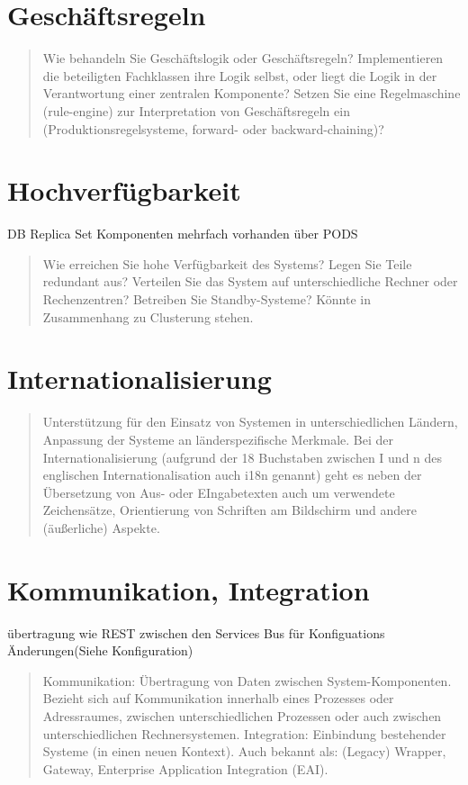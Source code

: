 \section{Geschäftsregeln}

\begin{quote}
	Wie behandeln Sie Geschäftslogik oder Geschäftsregeln? Implementieren die beteiligten Fachklassen ihre Logik selbst, oder liegt die Logik in der Verantwortung einer zentralen Komponente? Setzen Sie eine Regelmaschine (rule-engine) zur Interpretation von Geschäftsregeln ein (Produktionsregelsysteme, forward- oder backward-chaining)?
\end{quote}

\section{Hochverfügbarkeit}

DB Replica Set
Komponenten mehrfach vorhanden über PODS

\begin{quote}
	Wie erreichen Sie hohe Verfügbarkeit des Systems? Legen Sie Teile redundant aus? Verteilen Sie das System auf unterschiedliche Rechner oder Rechenzentren? Betreiben Sie Standby-Systeme?
	Könnte in Zusammenhang zu Clusterung stehen.
\end{quote}

\section{Internationalisierung}

\begin{quote}
	Unterstützung für den Einsatz von Systemen in unterschiedlichen Ländern, Anpassung der Systeme an länderspezifische Merkmale. Bei der Internationalisierung (aufgrund der 18 Buchstaben zwischen I und n des englischen Internationalisation auch i18n genannt) geht es neben der Übersetzung von Aus- oder EIngabetexten auch um verwendete Zeichensätze, Orientierung von Schriften am Bildschirm und andere (äußerliche) Aspekte.
\end{quote}

\section{Kommunikation, Integration}

übertragung wie REST zwischen den Services Bus für Konfiguations Änderungen(Siehe Konfiguration)

\begin{quote}
	Kommunikation: Übertragung von Daten zwischen System-Komponenten. Bezieht sich auf Kommunikation innerhalb eines Prozesses oder Adressraumes, zwischen unterschiedlichen Prozessen oder auch zwischen unterschiedlichen Rechnersystemen.
	Integration: Einbindung bestehender Systeme (in einen neuen Kontext). Auch bekannt als: (Legacy) Wrapper, Gateway, Enterprise Application Integration (EAI).
\end{quote}

